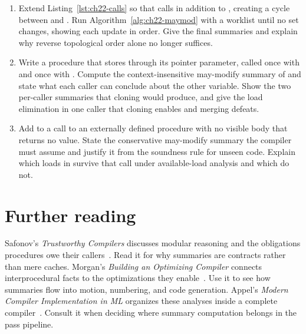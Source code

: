 \begin{enumerate}
  \item \label{ex:ch22-cycle-fixpoint}
  Extend Listing~\ref{lst:ch22-calls} so that  calls  in addition to , creating a cycle between  and .
  Run Algorithm~\ref{alg:ch22-maymod} with a worklist until no set changes, showing each update in order.
  Give the final summaries and explain why reverse topological order alone no longer suffices.
  \item \label{ex:ch22-merge-loss}
  Write a procedure  that stores through its pointer parameter, called once with  and once with .
  Compute the context-insensitive may-modify summary of  and state what each caller can conclude about the other variable.
  Show the two per-caller summaries that cloning would produce, and give the load elimination in one caller that cloning enables and merging defeats.
  \item \label{ex:ch22-unknown-call}
  Add to  a call to an externally defined procedure with no visible body that returns no value.
  State the conservative may-modify summary the compiler must assume and justify it from the soundness rule for unseen code.
  Explain which loads in  survive that call under available-load analysis and which do not.
\end{enumerate}

\section{Further reading}
\label{sec:ch22-further-reading}

Safonov's \emph{Trustworthy Compilers} discusses modular reasoning and the obligations procedures owe their callers~\cite{safonov-2010-trustworthy}.
Read it for why summaries are contracts rather than mere caches.
Morgan's \emph{Building an Optimizing Compiler} connects interprocedural facts to the optimizations they enable~\cite{morgan-1998-optimizing}.
Use it to see how summaries flow into motion, numbering, and code generation.
Appel's \emph{Modern Compiler Implementation in ML} organizes these analyses inside a complete compiler~\cite{appel-1998-modern}.
Consult it when deciding where summary computation belongs in the pass pipeline.

